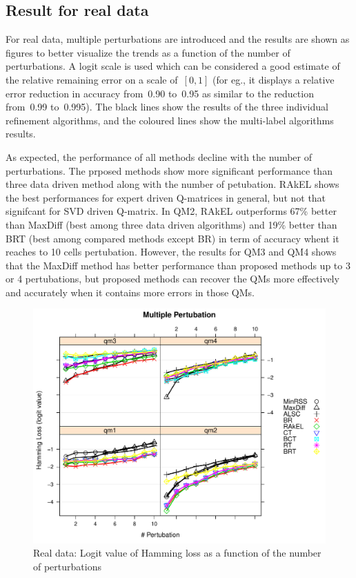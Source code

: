 \documentclass[11pt]{article}
\begin{document}
\subsection{Result for real data}
For real data, multiple perturbations are introduced and the results are shown as figures to better visualize the trends as a function of the number of perturbations.   A logit scale is used which can be considered a good estimate of the relative remaining error on a scale of~$[0,1]$ (for eg., it displays a relative error reduction in accuracy from~0.90 to~0.95 as similar to the reduction from~0.99 to~0.995). The black lines show the results of the three individual refinement algorithms, and the coloured lines show the multi-label algorithms results.  

As expected, the performance of all methods decline with the number of perturbations. The prposed methods show more significant performance than three data driven method along with the number of petubation. RAkEL shows the best performances for expert driven Q-matrices in general, but not that signifcant for SVD driven Q-matrix. In QM2, RAkEL outperforms 67\% better than MaxDiff (best among three data driven algorithms) and 19\% better than BRT (best among compared methods except BR) in term of accuracy whent it reaches to 10 cells pertubation.   However, the results for QM3 and QM4 shows that the MaxDiff method has better performance than proposed methods up to 3 or 4 pertubations, but proposed methods can recover the QMs more effectively and accurately when it contains more errors in those QMs.



\begin{figure}
  \centering
    \includegraphics[width=100 mm ,scale=0.25]{graph/HL.pdf}
  \caption{Real data: Logit value of Hamming loss as a function of the number of perturbations}\label{fig:HLforReal}
\end{figure}
\end{document}
